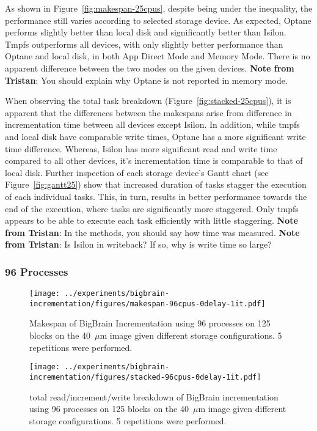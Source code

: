 \documentclass[conference]{IEEEtran}
\newcommand{\bigbrain}{BigBrain }
\newcommand{\tristan}[1]{\color{orange}\textbf{Note from Tristan}:
      #1 \color{black}}
\begin{document}
As shown in Figure~\ref{fig:makespan-25cpus}, despite being under the inequality, the
performance still varies according to selected storage device. As expected, Optane performs
slightly better than local disk and significantly better than Isilon. Tmpfs outperforms all
devices, with only slightly better performance than Optane and local disk, in both App Direct Mode and Memory Mode.
There is no apparent difference between the two modes on the given devices.
\tristan{You should explain why Optane is not reported in memory mode.}

When observing the total task breakdown (Figure~\ref{fig:stacked-25cpus}), it is
apparent that the differences between the makespans arise from difference in incrementation
time between all devices except Isilon. In addition, while tmpfs and local disk have comparable write times, Optane
has a more significant write time difference. Whereas, Isilon has more significant read and
write time compared to all other devices, it's incrementation time is comparable to that
of local disk. Further inspection of each storage device's Gantt chart (see Figure~\ref{fig:gantt25})
show that increased duration of tasks stagger the execution of each individual tasks. This, in turn,
results in better performance towards the end of the execution, where tasks are significantly more staggered.
Only tmpfs appears to be able to execute each task efficiently with little staggering.
\tristan{In the methods, you should say how time was measured.}
\tristan{Is Isilon in writeback? If so, why is write time so large?}
\subsubsection{96 Processes}
\begin{figure}
    \texttt{[image: ../experiments/bigbrain-incrementation/figures/makespan-96cpus-0delay-1it.pdf]}
    \captionsetup{width=\columnwidth}
    \caption{Makespan of \bigbrain Incrementation using 96 processes on 125 blocks on the 40~$\mu$m image given different storage configurations. 5 repetitions were performed.}\label{fig:makespan-96cpus}
\end{figure}
\begin{figure}
    \texttt{[image: ../experiments/bigbrain-incrementation/figures/stacked-96cpus-0delay-1it.pdf]}
    \captionsetup{width=\columnwidth}
    \caption{total read/increment/write breakdown of \bigbrain incrementation using 96 processes on 125 blocks on the 40~$\mu$m image given different storage configurations. 5 repetitions were performed.}\label{fig:stacked-96cpus}
\end{figure}
\end{document}
